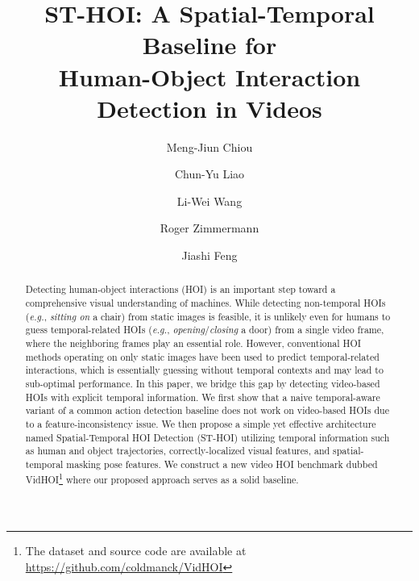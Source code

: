 \documentclass[sigconf]{acmart}
\begin{document}
\fancyhead{}

\acmPrice{}

\title{ST-HOI: A Spatial-Temporal Baseline for \\ Human-Object Interaction Detection in Videos}

\author{Meng-Jiun Chiou}

\author{Chun-Yu	Liao}


\author{Li-Wei Wang}

\author{Roger Zimmermann}

\author{Jiashi Feng}



\begin{abstract}
   Detecting human-object interactions (HOI) is an important step toward a comprehensive visual understanding of machines. 
   While detecting non-temporal HOIs (\emph{e.g.}, \textit{sitting on} a chair) from static images is feasible, it is unlikely even for humans to guess temporal-related HOIs (\emph{e.g.}, \textit{opening}/\textit{closing} a door) from a single video frame, where the neighboring frames play an essential role.
   However, conventional HOI methods operating on only static images have been used to predict temporal-related interactions, which is essentially guessing without temporal contexts and may lead to sub-optimal performance.
   In this paper, we bridge this gap by detecting video-based HOIs with explicit temporal information.
   We first show that a naive temporal-aware variant of a common action detection baseline does not work on video-based HOIs due to a feature-inconsistency issue. 
   We then propose a simple yet effective architecture named Spatial-Temporal HOI Detection (ST-HOI) utilizing temporal information such as human and object trajectories, correctly-localized visual features, and spatial-temporal masking pose features. 
   We construct a new video HOI benchmark dubbed VidHOI\footnote{The dataset and source code are available at \url{https://github.com/coldmanck/VidHOI}} where our proposed approach serves as a solid baseline.
\end{abstract}
\end{document}
